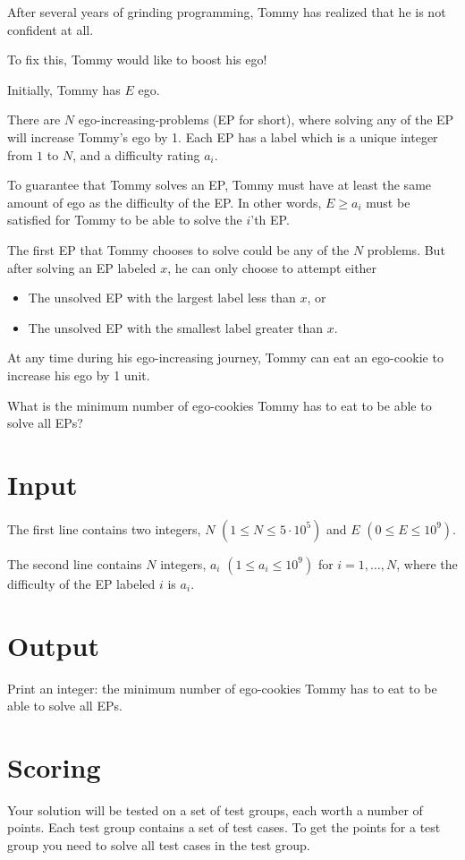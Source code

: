 \noindent

After several years of grinding programming, Tommy has realized that he is not confident at all.

To fix this, Tommy would like to boost his ego! 

Initially, Tommy has $E$ ego. 

There are $N$ ego-increasing-problems (EP for short), where solving any of the EP will increase Tommy's ego by 1.
Each EP has a label which is a unique integer from $1$ to $N$, and a difficulty rating $a_i$.

To guarantee that Tommy solves an EP, Tommy must have at least the same amount of ego as the difficulty of the EP. 
In other words, $E \geq a_i$ must be satisfied for Tommy to be able to solve the $i$'th EP.

The first EP that Tommy chooses to solve could be any of the $N$ problems.
But after solving an EP labeled $x$, he can only choose to attempt either
\begin{itemize}
  \item The unsolved EP with the largest label less than $x$, or
  \item The unsolved EP with the smallest label greater than $x$.
\end{itemize}

At any time during his ego-increasing journey, Tommy can eat an ego-cookie to increase his ego by 1 unit. 

What is the minimum number of ego-cookies Tommy has to eat to be able to solve all EPs?

\section*{Input}
\noindent
The first line contains two integers, $N$ $(1 \leq N \leq 5 \cdot 10^5)$ and $E$ $(0 \leq E \leq 10^9)$.

The second line contains $N$ integers, $a_i$ $(1 \leq a_i \leq 10^9)$ for $i = 1,\dots,N$, 
where the difficulty of the EP labeled $i$ is $a_i$.

\section*{Output}
\noindent
Print an integer: the minimum number of ego-cookies Tommy has to eat to be able to solve all EPs.

\section*{Scoring}
Your solution will be tested on a set of test groups, each worth a number of points. Each test group contains
a set of test cases. To get the points for a test group you need to solve all test cases in the test group.


